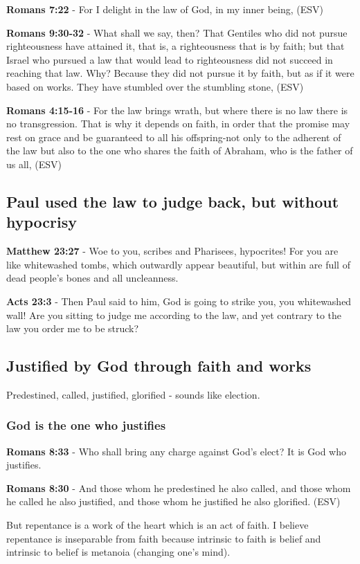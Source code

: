 \documentclass[11pt]{article}
\begin{document}
\textbf{Romans 7:22} - For I delight in the law of God, in my inner being, (ESV)

\textbf{Romans 9:30-32} - What shall we say, then? That Gentiles who did not pursue righteousness have attained it, that is, a righteousness that is by faith; but that Israel who pursued a law that would lead to righteousness did not succeed in reaching that law. Why? Because they did not pursue it by faith, but as if it were based on works. They have stumbled over the stumbling stone, (ESV)

\textbf{Romans 4:15-16} - For the law brings wrath, but where there is no law there is no transgression. That is why it depends on faith, in order that the promise may rest on grace and be guaranteed to all his offspring-not only to the adherent of the law but also to the one who shares the faith of Abraham, who is the father of us all, (ESV)

\subsection{Paul used the law to judge back, but without hypocrisy}
\label{sec:org58a6455}
\textbf{Matthew 23:27} - Woe to you, scribes and Pharisees, hypocrites! For you are like whitewashed tombs, which outwardly appear beautiful, but within are full of dead people's bones and all uncleanness.

\textbf{Acts 23:3} - Then Paul said to him, God is going to strike you, you whitewashed wall! Are you sitting to judge me according to the law, and yet contrary to the law you order me to be struck?

\subsection{Justified by God through faith and works}
\label{sec:orgfcdb55a}
Predestined, called, justified, glorified - sounds like election.
\subsubsection{God is the one who justifies}
\label{sec:orge1f7273}

\textbf{Romans 8:33} - Who shall bring any charge against God's elect? It is God who justifies.

\textbf{Romans 8:30} - And those whom he predestined he also called, and those whom he called he also justified, and those whom he justified he also glorified. (ESV)

But repentance is a work of the heart which is an act of faith.
I believe repentance is inseparable from faith because intrinsic to faith is belief and intrinsic to belief is metanoia (changing one's mind).
\end{document}
